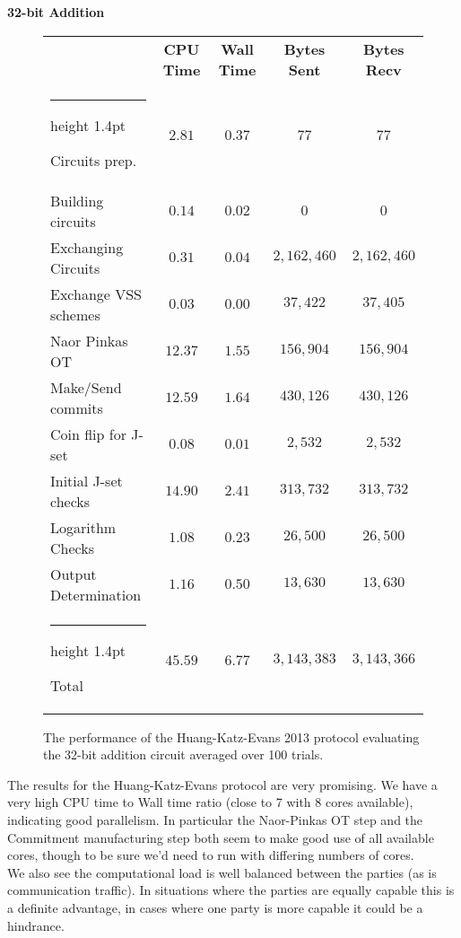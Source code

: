 \documentclass[11pt]{article} %
\makeatletter
\newcommand{\thickhline}{%
    \noalign {\ifnum 0=`}\fi \hrule height 1.4pt
    \futurelet \reserved@a \@xhline
}
\makeatother
\begin{document}
				\FloatBarrier
				\noindent \textbf{32-bit Addition}
				\begin{figure}[!ht]
					\begin{tabular}{| p{4.3cm} | c c c c |}
						\hline
						 & \textbf{CPU Time} & \textbf{Wall Time} & \textbf{Bytes Sent} & \textbf{Bytes Recv} \\
						\thickhline
						Circuits prep. & $2.81$ & $0.37$ & $77$ & $77$ \\
						\hline
						Building circuits & $0.14$ & $0.02$ & $0$ & $0$ \\
						\hline
						Exchanging Circuits & $0.31$ & $0.04$ & $2,162,460$ & $2,162,460$ \\
						\hline
						Exchange VSS schemes & $0.03$ & $0.00$ & $37,422$ & $37,405$ \\
						\hline
						Naor Pinkas OT & $12.37$ & $1.55$ & $156,904$ & $156,904$ \\
						\hline
						Make/Send commits & $12.59$ & $1.64$ & $430,126$ & $430,126$ \\
						\hline
						Coin flip for J-set & $0.08$ & $0.01$ & $2,532$ & $2,532$ \\
						\hline
						Initial J-set checks & $14.90$ & $2.41$ & $313,732$ & $313,732$ \\
						\hline
						Logarithm Checks & $1.08$ & $0.23$ & $26,500$ & $26,500$ \\
						\hline
						Output Determination & $1.16$ & $0.50$ & $13,630$ & $13,630$ \\
						\thickhline
						Total & $45.59$ & $6.77$ & $3,143,383$ & $3,143,366$ \\
						\hline
					\end{tabular}
					\caption{The performance of the Huang-Katz-Evans 2013 protocol evaluating the 32-bit addition circuit averaged over 100 trials.\label{table:HKE_2013_Add}}
				\end{figure}

				The results for the Huang-Katz-Evans protocol are very promising. We have a very high CPU time to Wall time ratio (close to 7 with 8 cores available), indicating good parallelism. In particular the Naor-Pinkas OT step and the Commitment manufacturing step both seem to make good use of all available cores, though to be sure we'd need to run with differing numbers of cores.\\ 

				We also see the computational load is well balanced between the parties (as is communication traffic). In situations where the parties are equally capable this is a definite advantage, in cases where one party is more capable it could be a hindrance.\\
\end{document}
